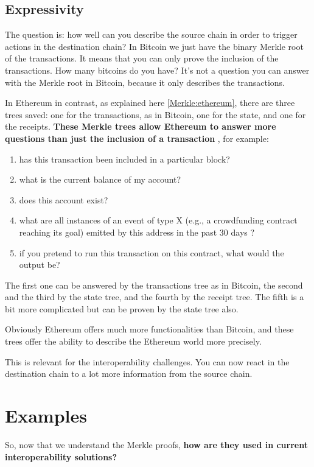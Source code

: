 \subsection{Expressivity}
The question is: how well can you describe the source chain in order to trigger actions in the destination chain?
In Bitcoin we just have the binary Merkle root of the transactions. It means that you can only prove the inclusion of the transactions. 
How many bitcoins do you have? It's not a question you can answer with the Merkle root in Bitcoin, because it only describes the transactions. 

In Ethereum in contrast, as explained here \ref{Merkle:ethereum}, there are three trees saved: one for the transactions, as in Bitcoin, one for the state, and one for the receipts. 
\textbf{
These Merkle trees allow Ethereum to answer more questions than just the inclusion of a transaction
}, for example:
\begin{enumerate}
\item has this transaction been included in a particular block?
\item what is the current balance of my account?
\item does this account exist?
\item what are all instances of an event of type X (e.g., a crowdfunding contract reaching its goal) emitted by this address in the past 30 days ?
\item if you pretend to run this transaction on this contract, what would the output be?
\end{enumerate}

The first one can be answered by the transactions tree as in Bitcoin, the second and the third by the state tree, and the fourth by the receipt tree. The fifth is a bit more complicated but can be proven by the state tree also. 


Obviously Ethereum offers much more functionalities than Bitcoin, and these trees offer the ability to describe the Ethereum world more precisely. 

This is relevant for the interoperability challenges. You can now react in the destination chain to a lot more information from the source chain. 

\section{Examples}
So, now that we understand the Merkle proofs, \textbf{how are they used in current interoperability solutions?}


